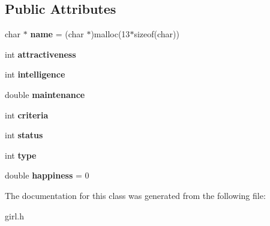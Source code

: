 \subsection*{Public Attributes}
\begin{DoxyCompactItemize}
\item 
char $\ast$ {\bfseries name} = (char $\ast$)malloc(13$\ast$sizeof(char))\hypertarget{classgirl_a06b2f3111ab075be59af1a6998b0202a}{}\label{classgirl_a06b2f3111ab075be59af1a6998b0202a}

\item 
int {\bfseries attractiveness}\hypertarget{classgirl_a0ba667f73d41f7bc3236141daaec9246}{}\label{classgirl_a0ba667f73d41f7bc3236141daaec9246}

\item 
int {\bfseries intelligence}\hypertarget{classgirl_a6c7e5b42204c88fae8b91aae92ae17f1}{}\label{classgirl_a6c7e5b42204c88fae8b91aae92ae17f1}

\item 
double {\bfseries maintenance}\hypertarget{classgirl_a8baa2d85e783ca408500512d39e37b78}{}\label{classgirl_a8baa2d85e783ca408500512d39e37b78}

\item 
int {\bfseries criteria}\hypertarget{classgirl_ae30abee4ad0c4d8da3797b40075c391a}{}\label{classgirl_ae30abee4ad0c4d8da3797b40075c391a}

\item 
int {\bfseries status}\hypertarget{classgirl_a3c12399f01c1068062fbefb2206d5457}{}\label{classgirl_a3c12399f01c1068062fbefb2206d5457}

\item 
int {\bfseries type}\hypertarget{classgirl_a8e02617b5ea362f8c1311713de02f977}{}\label{classgirl_a8e02617b5ea362f8c1311713de02f977}

\item 
double {\bfseries happiness} = 0\hypertarget{classgirl_aee96b657f7b3eefdb3e0f162bc527dce}{}\label{classgirl_aee96b657f7b3eefdb3e0f162bc527dce}

\end{DoxyCompactItemize}


The documentation for this class was generated from the following file\+:\begin{DoxyCompactItemize}
\item 
girl.\+h\end{DoxyCompactItemize}
